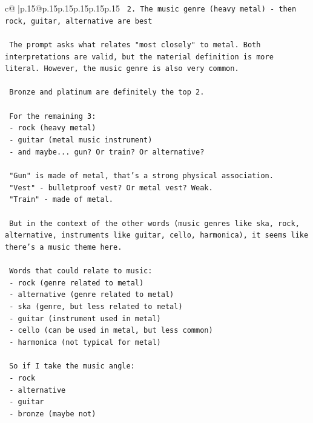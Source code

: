 \documentclass{article}
\begin{document}
{\begin{supertabular}{c@{$\;$}|p{.15\linewidth}@{}p{.15\linewidth}p{.15\linewidth}p{.15\linewidth}p{.15\linewidth}p{.15\linewidth}}
{{{\texttt{ 2. The music genre (heavy metal) {-} then rock, guitar, alternative are best} \\
\\ 
\texttt{ The prompt asks what relates "most closely" to metal. Both interpretations are valid, but the material definition is more literal. However, the music genre is also very common.} \\
\\ 
\texttt{ Bronze and platinum are definitely the top 2.} \\
\\ 
\texttt{ For the remaining 3:} \\
\texttt{ {-} rock (heavy metal)} \\
\texttt{ {-} guitar (metal music instrument)} \\
\texttt{ {-} and maybe... gun? Or train? Or alternative?} \\
\\ 
\texttt{ "Gun" is made of metal, that's a strong physical association.} \\
\texttt{ "Vest" {-} bulletproof vest? Or metal vest? Weak.} \\
\texttt{ "Train" {-} made of metal.} \\
\\ 
\texttt{ But in the context of the other words (music genres like ska, rock, alternative, instruments like guitar, cello, harmonica), it seems like there's a music theme here.} \\
\\ 
\texttt{ Words that could relate to music:} \\
\texttt{ {-} rock (genre related to metal)} \\
\texttt{ {-} alternative (genre related to metal)} \\
\texttt{ {-} ska (genre, but less related to metal)} \\
\texttt{ {-} guitar (instrument used in metal)} \\
\texttt{ {-} cello (can be used in metal, but less common)} \\
\texttt{ {-} harmonica (not typical for metal)} \\
\\ 
\texttt{ So if I take the music angle:} \\
\texttt{ {-} rock} \\
\texttt{ {-} alternative} \\
\texttt{ {-} guitar} \\
\texttt{ {-} bronze (maybe not)} \\
}}}
\end{supertabular}}
\end{document}
